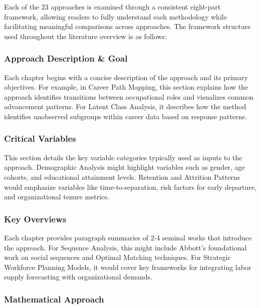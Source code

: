 \documentclass[./main.tex]{subfiles}
\begin{document}
Each of the 23 approaches is examined through a consistent eight-part
framework, allowing readers to fully understand each methodology while
facilitating meaningful comparisons across approaches. The framework
structure used throughout the literature overview is as follows:

\subsubsection{Approach Description \& Goal}\label{approach-description-goal}

Each chapter begins with a concise description of the approach and its
primary objectives. For example, in Career Path Mapping, this section
explains how the approach identifies transitions between occupational
roles and visualizes common advancement patterns. For Latent Class
Analysis, it describes how the method identifies unobserved subgroups
within career data based on response patterns.

\subsubsection{Critical Variables}\label{critical-variables}

This section details the key variable categories typically used as
inputs to the approach. Demographic Analysis might highlight variables
such as gender, age cohorts, and educational attainment levels.
Retention and Attrition Patterns would emphasize variables like
time-to-separation, risk factors for early departure, and organizational
tenure metrics.

\subsubsection{Key Overviews}\label{key-overviews}

Each chapter provides paragraph summaries of 2-4 seminal works that
introduce the approach. For Sequence Analysis, this might include
Abbott's foundational work on social sequences and Optimal Matching
techniques. For Strategic Workforce Planning Models, it would cover key
frameworks for integrating labor supply forecasting with organizational
demands.

\subsubsection{Mathematical Approach}\label{mathematical-approach}
\end{document}
